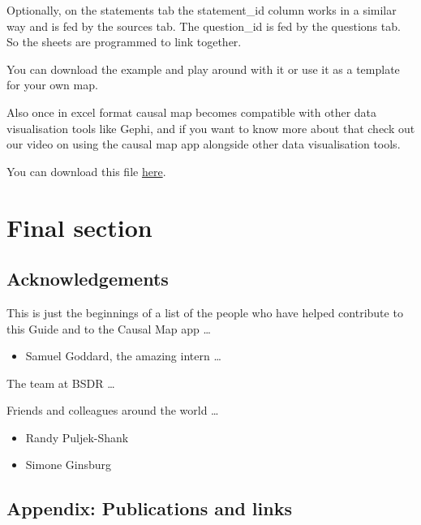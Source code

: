 \documentclass[
]{book}
\providecommand{\tightlist}{%
  \setlength{\itemsep}{0pt}\setlength{\parskip}{0pt}}
\begin{document}
Optionally, on the statements tab the statement\_id column works in a similar way and is fed by the sources tab. The question\_id is fed by the questions tab. So the sheets are programmed to link together.

You can download the example and play around with it or use it as a template for your own map.

Also once in excel format causal map becomes compatible with other data visualisation tools like Gephi, and if you want to know more about that check out our video on using the causal map app alongside other data visualisation tools.

You can download this file \href{https://docs.google.com/spreadsheets/d/12eXQDJtvlLO6qRrwbxwvkchfdTNLSbjo/edit?usp=sharing\&ouid=112812082380437768869\&rtpof=true\&sd=true}{here}.

\hypertarget{part-final-section}{%
\part{Final section}\label{part-final-section}}

\hypertarget{acknowledgements}{%
\chapter{Acknowledgements}\label{acknowledgements}}

This is just the beginnings of a list of the people who have helped contribute to this Guide and to the Causal Map app \ldots{}

\begin{itemize}
\tightlist
\item
  Samuel Goddard, the amazing intern \ldots{}
\end{itemize}

The team at BSDR \ldots{}

Friends and colleagues around the world \ldots{}

\begin{itemize}
\item
  Randy Puljek-Shank
\item
  Simone Ginsburg
\end{itemize}

\hypertarget{appendix-publications-and-links}{%
\chapter{Appendix: Publications and links}\label{appendix-publications-and-links}}
\end{document}

